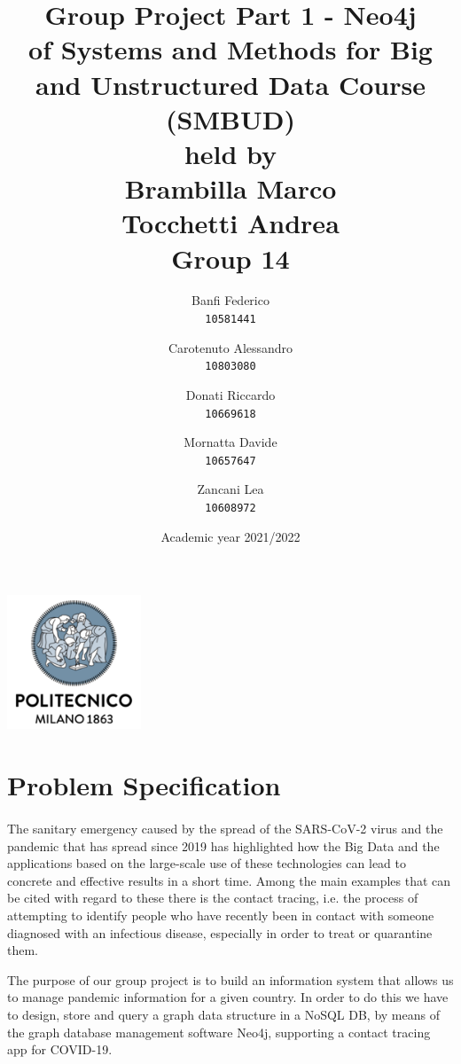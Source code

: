 \documentclass[a4paper,12pt]{article}
\begin{document}
\title{%
  Group Project Part 1 - Neo4j \\
  \large of Systems and Methods for Big
    and Unstructured Data Course \\(SMBUD)\\
    held by\\ Brambilla Marco\\ Tocchetti Andrea \\
  \vspace{5mm}
  \Large \textbf{Group 14}}
\author{Banfi Federico\\
  \texttt{10581441}
  \and
  Carotenuto Alessandro\\
  \texttt{10803080}
  \and
  Donati Riccardo\\
  \texttt{10669618}
  \and
  Mornatta Davide\\
  \texttt{10657647}
  \and
  Zancani Lea\\
  \texttt{10608972}}
\date{Academic year 2021/2022}
\maketitle
\begin{center}
  \includegraphics[width=4cm]{polilogo.png}\\
\end{center}
\newpage
\tableofcontents
\newpage

\section{Problem Specification}
\paragraph{}The sanitary emergency caused by the spread of the SARS-CoV-2 virus and the pandemic that has spread since 2019 has highlighted how the Big Data and the applications based on the large-scale use of these technologies can lead to concrete and effective results in a short time. Among the main examples that can be cited with regard to these there is the contact tracing, i.e. the process of attempting to identify people who have recently been in contact with someone diagnosed with an infectious disease, especially in order to treat or quarantine them. \par
The purpose of our group project is to build an information system that allows us to manage pandemic information for a given country. In order to do this we have to design, store and query a graph data structure in a NoSQL DB, by means of the graph database management software Neo4j, supporting a contact tracing app for COVID-19.
\end{document}
